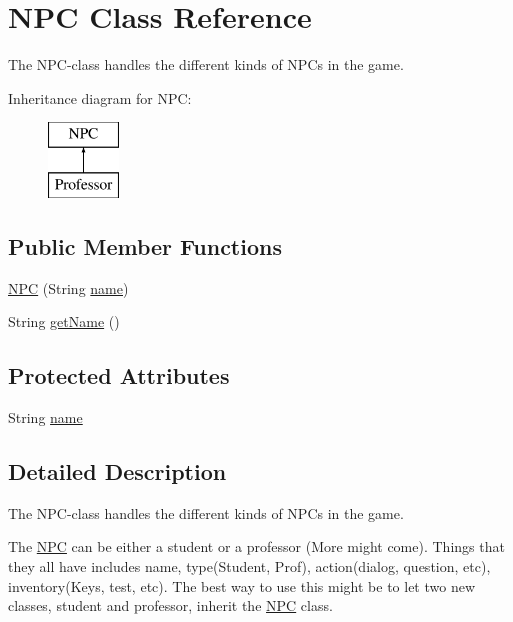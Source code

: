 \hypertarget{classNPC}{}\section{N\+P\+C Class Reference}
\label{classNPC}


The N\+P\+C-\/class handles the different kinds of N\+P\+Cs in the game.  


Inheritance diagram for N\+P\+C\+:\begin{figure}[H]
\begin{center}
\leavevmode
\includegraphics[height=2.000000cm]{classNPC}
\end{center}
\end{figure}
\subsection*{Public Member Functions}
\begin{DoxyCompactItemize}
\item 
\hyperlink{classNPC_aeda507dafafcbe227ef1b9fddb16a81c}{N\+P\+C} (String \hyperlink{classNPC_aea85d6c8ba3ff811f54571fde45f5329}{name})
\item 
String \hyperlink{classNPC_af92732b6477b26c4c8b08cf6b18b116f}{get\+Name} ()
\end{DoxyCompactItemize}
\subsection*{Protected Attributes}
\begin{DoxyCompactItemize}
\item 
String \hyperlink{classNPC_aea85d6c8ba3ff811f54571fde45f5329}{name}
\end{DoxyCompactItemize}


\subsection{Detailed Description}
The N\+P\+C-\/class handles the different kinds of N\+P\+Cs in the game. 

The \hyperlink{classNPC}{N\+P\+C} can be either a student or a professor (More might come). Things that they all have includes name, type(\+Student, Prof), action(dialog, question, etc), inventory(\+Keys, test, etc). The best way to use this might be to let two new classes, student and professor, inherit the \hyperlink{classNPC}{N\+P\+C} class. 

